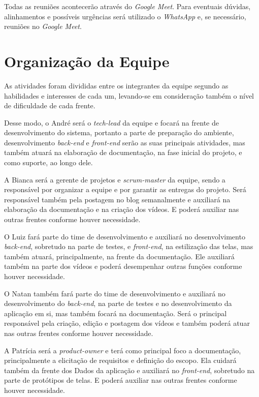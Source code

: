 Todas as reuniões acontecerão através do \textit{Google Meet}.
Para eventuais dúvidas, alinhamentos e possíveis urgências será utilizado o \textit{WhatsApp} e, se necessário, reuniões no \textit{Google Meet}. 


\section{Organização da Equipe}
As atividades foram divididas entre os integrantes da equipe segundo as habilidades e interesses de cada um, levando-se em consideração também o nível de dificuldade de cada frente.


Desse modo, o André será o \textit{\gls{tech-lead}} da equipe e focará na frente de desenvolvimento do sistema, portanto a parte de preparação do ambiente, desenvolvimento \textit{\gls{back-end}} e \textit{\gls{front-end}} serão as suas principais atividades, mas também atuará na elaboração de documentação, na fase inicial do projeto, e como suporte, ao longo dele.


A Bianca será a gerente de projetos e \textit{\gls{scrum-master}} da equipe, sendo a responsável por organizar a equipe e por garantir as entregas do projeto. Será responsável também pela postagem no blog semanalmente e auxiliará na elaboração da documentação e na criação dos vídeos. E poderá auxiliar nas outras frentes conforme houver necessidade.


O Luiz fará parte do time de desenvolvimento e auxiliará no desenvolvimento \textit{\gls{back-end}}, sobretudo na parte de testes, e \textit{\gls{front-end}}, na estilização das telas, mas também atuará, principalmente, na frente da documentação. Ele auxiliará também na parte dos vídeos e poderá desempenhar outras funções conforme houver necessidade.


O Natan também fará parte do time de desenvolvimento e auxiliará no desenvolvimento do \textit{\gls{back-end}}, na parte de testes e no desenvolvimento da aplicação em si, mas também focará na documentação. Será o principal responsável pela criação, edição e postagem dos vídeos e também poderá atuar nas outras frentes conforme houver necessidade.


A Patrícia será a \textit{\gls{product-owner}} e terá como principal foco a documentação, principalmente a elicitação de requisitos e definição do escopo. Ela cuidará também da frente dos Dados da aplicação e auxiliará no \textit{\gls{front-end}}, sobretudo na parte de protótipos de telas. E poderá auxiliar nas outras frentes conforme houver necessidade.


